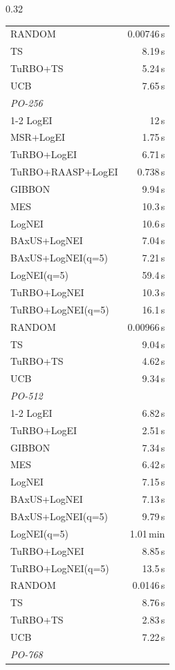 \begin{table}[h]
\begin{subtable}[t]{0.32\textwidth}
\begin{tabular}{lr}
      RANDOM & 0.00746\,s \\
      TS & 8.19\,s \\
      TuRBO+TS & 5.24\,s \\
      UCB & 7.65\,s \\
      \midrule
      \multicolumn{2}{l}{\textit{PO-256}} \\
      \cmidrule{1-2}
      LogEI & 12\,s \\
      MSR+LogEI & 1.75\,s \\
      TuRBO+LogEI & 6.71\,s \\
      TuRBO+RAASP+LogEI & 0.738\,s \\
      GIBBON & 9.94\,s \\
      MES & 10.3\,s \\
      LogNEI & 10.6\,s \\
      BAxUS+LogNEI & 7.04\,s \\
      BAxUS+LogNEI(q=5) & 7.21\,s \\
      LogNEI(q=5) & 59.4\,s \\
      TuRBO+LogNEI & 10.3\,s \\
      TuRBO+LogNEI(q=5) & 16.1\,s \\
      RANDOM & 0.00966\,s \\
      TS & 9.04\,s \\
      TuRBO+TS & 4.62\,s \\
      UCB & 9.34\,s \\
      \midrule
      \multicolumn{2}{l}{\textit{PO-512}} \\
      \cmidrule{1-2}
      LogEI & 6.82\,s \\
      TuRBO+LogEI & 2.51\,s \\
      GIBBON & 7.34\,s \\
      MES & 6.42\,s \\
      LogNEI & 7.15\,s \\
      BAxUS+LogNEI & 7.13\,s \\
      BAxUS+LogNEI(q=5) & 9.79\,s \\
      LogNEI(q=5) & 1.01\,min \\
      TuRBO+LogNEI & 8.85\,s \\
      TuRBO+LogNEI(q=5) & 13.5\,s \\
      RANDOM & 0.0146\,s \\
      TS & 8.76\,s \\
      TuRBO+TS & 2.83\,s \\
      UCB & 7.22\,s \\
      \midrule
      \multicolumn{2}{l}{\textit{PO-768}} \\

\end{tabular}
\end{subtable}
\end{table}
